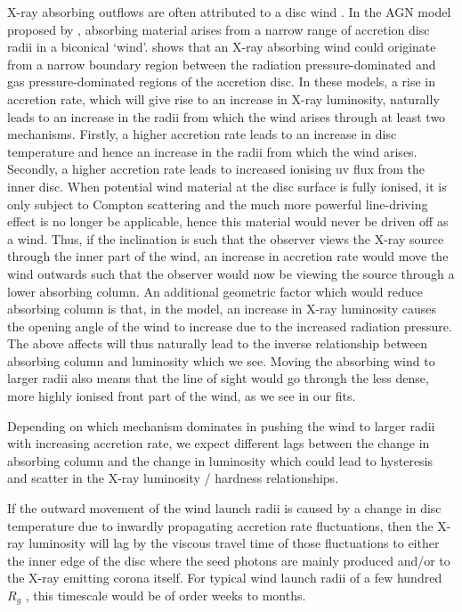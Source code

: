 \documentclass[useAMS,usenatbib]{sam}
\begin{document}
X-ray absorbing outflows are often attributed to a disc wind \citep{tombesi}. In the AGN model proposed by \citet{elvis}, absorbing material arises from a narrow range of
accretion disc radii in a biconical `wind'. \citet{nicastro} shows that an X-ray absorbing wind could originate from a narrow boundary region between the radiation
pressure-dominated and gas pressure-dominated regions of the accretion disc. In these models, a rise in accretion rate, which will give rise to an increase in X-ray
luminosity, naturally leads to an increase in the radii from which the wind arises through at least two mechanisms.  Firstly, a higher accretion rate leads to an
increase in disc temperature and hence an increase in the radii from which the wind arises.  Secondly, a higher accretion rate leads to increased ionising uv flux from
the inner disc. When potential wind material at the disc surface is fully ionised, it is only subject to Compton scattering and the much more powerful line-driving effect
\citep{proga99} is no longer be applicable, hence this material would never be driven off as a wind. Thus, if the inclination is such that the observer views the
X-ray source through the inner part of the wind, an increase in accretion rate would move the wind outwards such that the observer would now be viewing the source through
a lower absorbing column.  An additional geometric factor which would reduce absorbing column is that, in the \citet{elvis} model, an increase in X-ray luminosity causes
the opening angle of the wind to increase due to the increased radiation pressure. The above affects will thus naturally lead to the inverse relationship between
absorbing column and luminosity which we see. Moving the absorbing wind to larger radii also means that the line of sight would go through the less dense, more highly
ionised front part of the wind, as we see in our fits. %

Depending on which mechanism dominates in pushing the wind to larger radii with increasing accretion rate, we expect different lags between the change in absorbing column
and the change in luminosity which could lead to hysteresis and scatter in the X-ray luminosity / hardness relationships.

If the outward movement of the wind launch radii is caused by a change in disc temperature due to inwardly propagating accretion rate fluctuations, then the
X-ray luminosity will lag by the viscous travel time of those fluctuations to either the inner edge of the disc where the seed photons are mainly produced and/or to the
X-ray emitting corona itself. For typical wind launch radii of a few hundred $R_g$ \citep{higginbottom}, this timescale would be of order weeks to months. 
\end{document}
